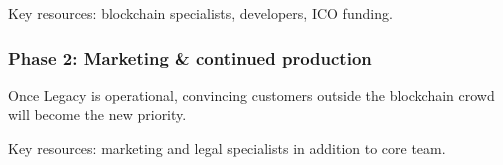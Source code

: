 Key resources: blockchain specialists, developers, ICO funding.


\subsubsection{Phase 2: Marketing & continued production} %
\label{ssub:phase_2_marketing_continued_production}
Once Legacy is operational, convincing customers outside the blockchain crowd will become the new priority.

Key resources: marketing and legal specialists in addition to core team.



